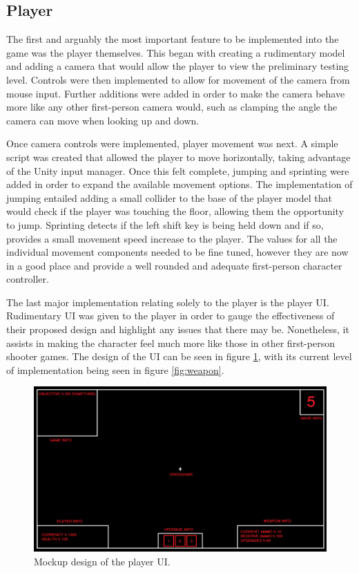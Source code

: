 \documentclass[11pt]{article}
\begin{document}
\subsection{Player}
The first and arguably the most important feature to be implemented into the game was the player
themselves. This began with creating a rudimentary model and adding a camera that would allow the
player to view the preliminary testing level. Controls were then implemented to allow for movement
of the camera from mouse input. Further additions were added in order to make the camera behave
more like any other first-person camera would, such as clamping the angle the camera can move when
looking up and down. 

Once camera controls were implemented, player movement was next. A simple script was created that
allowed the player to move horizontally, taking advantage of the Unity input manager. Once this
felt complete, jumping and sprinting were added in order to expand the available movement options.
The implementation of jumping entailed adding a small collider to the base of the player model that
would check if the player was touching the floor, allowing them the opportunity to jump. Sprinting
detects if the left shift key is being held down and if so, provides a small movement speed
increase to the player. The values for all the individual movement components needed to be fine
tuned, however they are now in a good place and provide a well rounded and adequate first-person
character controller. 

The last major implementation relating solely to the player is the player UI. Rudimentary UI was
given to the player in order to gauge the effectiveness of their proposed design and highlight any
issues that there may be. Nonetheless, it assists in making the character feel much more like those
in other first-person shooter games. The design of the UI can be seen in figure
\ref{fig:ui-mockup}, with its current level of implementation being seen in figure
\ref{fig:weapon}. \\

\begin{figure}[htb] 
    \centering
    \includegraphics[width=\columnwidth]{ui-mockup}
    \caption{Mockup design of the player UI.}
    \label{fig:ui-mockup}
\end{figure}
\end{document}
